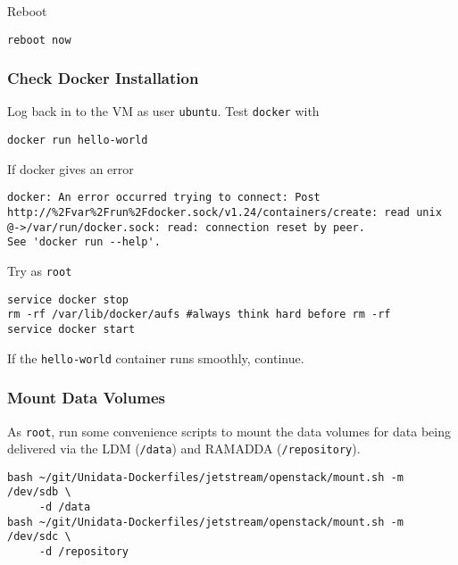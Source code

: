 \documentclass[onecolumn,9pt]{article}
\begin{document}
Reboot

\lstset{frame=lines,basicstyle=\footnotesize,numbers=left,numberstyle=\tiny,language=:eval,label= ,caption= ,captionpos=b}
\begin{lstlisting}
reboot now
\end{lstlisting}

\subsubsection{Check Docker Installation}
\label{sec:orgheadline17}

Log back in to the VM as user \texttt{ubuntu}. Test \texttt{docker} with

\lstset{frame=lines,basicstyle=\footnotesize,numbers=left,numberstyle=\tiny,language=sh,label= ,caption= ,captionpos=b}
\begin{lstlisting}
docker run hello-world
\end{lstlisting}

If docker gives an error

\begin{verbatim}
docker: An error occurred trying to connect: Post http://%2Fvar%2Frun%2Fdocker.sock/v1.24/containers/create: read unix @->/var/run/docker.sock: read: connection reset by peer.
See 'docker run --help'.
\end{verbatim}

Try as \texttt{root}

\lstset{frame=lines,basicstyle=\footnotesize,numbers=left,numberstyle=\tiny,language=sh,label= ,caption= ,captionpos=b}
\begin{lstlisting}
service docker stop
rm -rf /var/lib/docker/aufs #always think hard before rm -rf
service docker start
\end{lstlisting}

If the \texttt{hello-world} container runs smoothly, continue.

\subsubsection{Mount Data Volumes}
\label{sec:orgheadline18}

As \texttt{root}, run some convenience scripts to mount the data volumes for data being delivered via the LDM (\texttt{/data}) and RAMADDA (\texttt{/repository}).

\lstset{frame=lines,basicstyle=\footnotesize,numbers=left,numberstyle=\tiny,language=sh,label= ,caption= ,captionpos=b}
\begin{lstlisting}
bash ~/git/Unidata-Dockerfiles/jetstream/openstack/mount.sh -m /dev/sdb \
     -d /data
bash ~/git/Unidata-Dockerfiles/jetstream/openstack/mount.sh -m /dev/sdc \
     -d /repository
\end{lstlisting}
\end{document}
